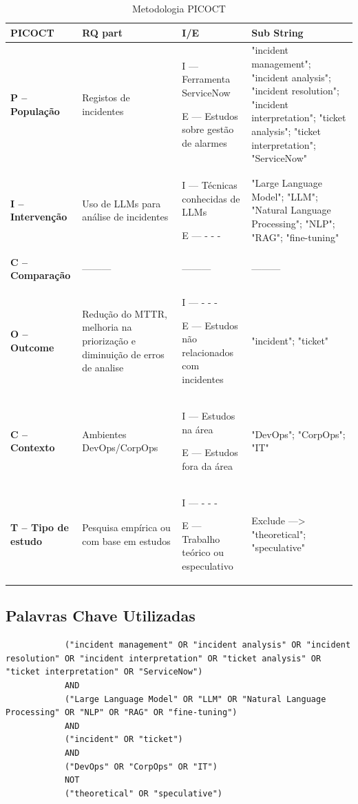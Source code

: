 		\begin{table}[H]
			\centering
			\begin{tabular}{|l|p{3cm}|p{3cm}|p{4cm}|}
				\hline
				\textbf{PICOCT} & \textbf{RQ part} & \textbf{I/E} & \textbf{Sub String} \\
				\hline
				\textbf{P – População} & Registos de incidentes & I — Ferramenta ServiceNow\newline 
				
				E — Estudos sobre gestão de alarmes & "incident management"; "incident analysis"; "incident resolution"; "incident interpretation"; "ticket analysis"; "ticket interpretation"; "ServiceNow" \\
				\hline
				\textbf{I – Intervenção} & Uso de LLMs para análise de incidentes & I — Técnicas conhecidas de LLMs\newline
				
				E — - - - & "Large Language Model"; "LLM"; "Natural Language Processing"; "NLP"; "RAG"; "fine-tuning" \\
				\hline
				\textbf{C – Comparação} & ——— & ——— & ——— \\
				\hline
				\textbf{O – Outcome} & Redução do MTTR, melhoria na priorização e diminuição de erros de analise & I — - - -\newline
				
				E — Estudos não relacionados com incidentes & "incident"; "ticket" \\
				\hline
				\textbf{C – Contexto} & Ambientes DevOps/CorpOps & I — Estudos na área\newline
				
				E — Estudos fora da área & "DevOps"; "CorpOps"; "IT"\\
				\hline
				\textbf{T – Tipo de estudo} & Pesquisa empírica ou com base em estudos & I — - - -\newline
				
				E — Trabalho teórico ou especulativo & Exclude —> "theoretical"; "speculative" \\
				\hline
			\end{tabular}
			\caption[Metodologia PICOCT]{Metodologia PICOCT}
			\label{tab:picocs}
		\end{table}


	\subsection{Palavras Chave Utilizadas}
		\lstset{language=Java}
		\begin{lstlisting}
			("incident management" OR "incident analysis" OR "incident resolution" OR "incident interpretation" OR "ticket analysis" OR "ticket interpretation" OR "ServiceNow")
			AND
			("Large Language Model" OR "LLM" OR "Natural Language Processing" OR "NLP" OR "RAG" OR "fine-tuning")
			AND
			("incident" OR "ticket")
			AND
			("DevOps" OR "CorpOps" OR "IT")
			NOT
			("theoretical" OR "speculative")
		\end{lstlisting}
	
